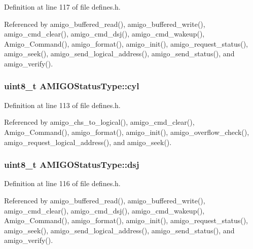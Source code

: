 Definition at line 117 of file defines.\+h.



Referenced by amigo\+\_\+buffered\+\_\+read(), amigo\+\_\+buffered\+\_\+write(), amigo\+\_\+cmd\+\_\+clear(), amigo\+\_\+cmd\+\_\+dsj(), amigo\+\_\+cmd\+\_\+wakeup(), Amigo\+\_\+\+Command(), amigo\+\_\+format(), amigo\+\_\+init(), amigo\+\_\+request\+\_\+status(), amigo\+\_\+seek(), amigo\+\_\+send\+\_\+logical\+\_\+address(), amigo\+\_\+send\+\_\+status(), and amigo\+\_\+verify().

\subsubsection[{\texorpdfstring{cyl}{cyl}}]{\setlength{\rightskip}{0pt plus 5cm}uint8\+\_\+t A\+M\+I\+G\+O\+Status\+Type\+::cyl}\hypertarget{structAMIGOStatusType_af5b8f182ebd61f2eb51614fc402b69ee}{}\label{structAMIGOStatusType_af5b8f182ebd61f2eb51614fc402b69ee}


Definition at line 113 of file defines.\+h.



Referenced by amigo\+\_\+chs\+\_\+to\+\_\+logical(), amigo\+\_\+cmd\+\_\+clear(), Amigo\+\_\+\+Command(), amigo\+\_\+format(), amigo\+\_\+init(), amigo\+\_\+overflow\+\_\+check(), amigo\+\_\+request\+\_\+logical\+\_\+address(), and amigo\+\_\+seek().

\subsubsection[{\texorpdfstring{dsj}{dsj}}]{\setlength{\rightskip}{0pt plus 5cm}uint8\+\_\+t A\+M\+I\+G\+O\+Status\+Type\+::dsj}\hypertarget{structAMIGOStatusType_a8c10963988b7c4633720397bca443b59}{}\label{structAMIGOStatusType_a8c10963988b7c4633720397bca443b59}


Definition at line 116 of file defines.\+h.



Referenced by amigo\+\_\+buffered\+\_\+read(), amigo\+\_\+buffered\+\_\+write(), amigo\+\_\+cmd\+\_\+clear(), amigo\+\_\+cmd\+\_\+dsj(), amigo\+\_\+cmd\+\_\+wakeup(), Amigo\+\_\+\+Command(), amigo\+\_\+format(), amigo\+\_\+init(), amigo\+\_\+request\+\_\+status(), amigo\+\_\+seek(), amigo\+\_\+send\+\_\+logical\+\_\+address(), amigo\+\_\+send\+\_\+status(), and amigo\+\_\+verify().

